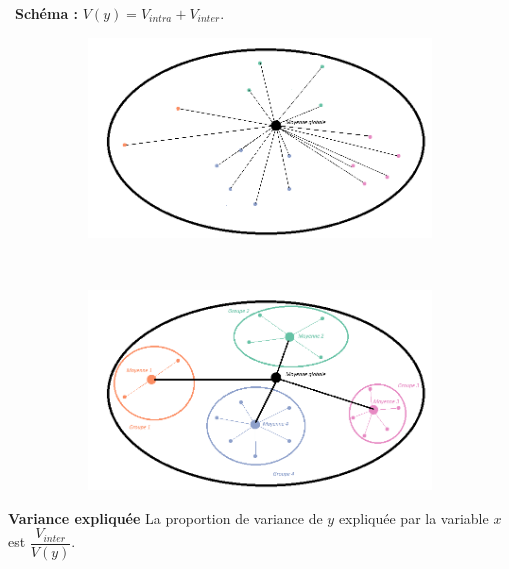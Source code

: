 \documentclass[aspectratio=169,xcolor=dvipsnames]{beamer}
\begin{document}
\begin{frame}
\textcolor{nyupurple}{\faLightbulb[regular] \ \textbf{Schéma :}} $V(y) = V_{intra} + V_{inter}$.

	\begin{figure}
	\centering
	\begin{subfigure}{0.45\textwidth}
	\includegraphics[width=\textwidth]{var_globale.png}
	\end{subfigure}~
	\begin{subfigure}{0.45\textwidth}
	\includegraphics[width=\textwidth]{decomp_var.png}
	\end{subfigure}
	\end{figure}
	
	\begin{block}{\textbf{Variance expliquée}}
	La proportion de variance de $y$ expliquée par la variable $x$ est $\dfrac{V_{inter}}{V(y)}$.
	\end{block}
\end{frame}
\end{document}
